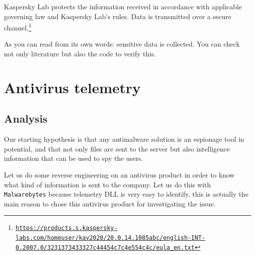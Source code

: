 \begin{tcolorbox}
  Kaspersky Lab protects the information received in accordance with
  applicable governing law and Kaspersky Lab's rules. Data is transmitted over
  a secure channel.\footnote{\href{https://products.s.kaspersky-labs.com/homeuser/kav2020/20.0.14.1085abc/english-INT-0.2007.0/3231373433327c44454c7c4e554c4c/eula_en.txt}{\texttt{https://products.s.kaspersky-labs.com/homeuser/kav2020/20.0.14.1085abc/english-INT-0.2007.0/3231373433327c44454c7c4e554c4c/eula_en.txt}}}
\end{tcolorbox}
As you can read from its own words: sensitive data is collected. You can check
not only literature but also the code to verify this.

\section{Antivirus telemetry}

\subsection{Analysis}
Our starting hypothesis is that any antimalware solution is an espionage tool
in potential, and that not only files are sent to the server but also
intelligence information that can be used to spy the users.

Let us do some reverse engineering on an antivirus product in order to know
what kind of information is sent to the company. Let us do this with
\texttt{Malwarebytes} because telemetry DLL is very easy to identify, this is
actually the main reason to chose this antivirus product for investigating the
issue.

